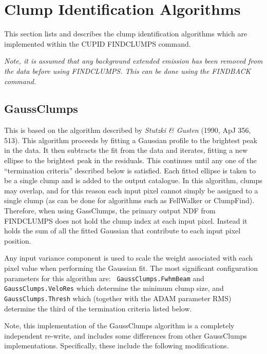 \documentclass[twoside,11pt]{article}
\newcommand{\htmlref}[2]{#1}
\newcommand{\xlabel}[1]{}
\renewcommand{\_}{\texttt{\symbol{95}}}
\begin{document}
\section{Clump Identification Algorithms}
This section lists and describes the clump identification algorithms
which are implemented within the CUPID \htmlref{FINDCLUMPS}{FINDCLUMPS}
command.

\begin{center}
\emph{Note, it is assumed that any background extended emission has
been removed from the data before using FINDCLUMPS. This can be done
using the \htmlref{FINDBACK}{FINDBACK} command.}
\end{center}

\subsection{\xlabel{gaussclumps}GaussClumps}

This is based on the algorithm described by \emph{Stutzki \& Gusten}
(1990, ApJ 356, 513). This algorithm proceeds by fitting a Gaussian
profile to the brightest peak in the data. It then subtracts the fit from
the data and iterates, fitting a new ellipse to the brightest peak in the
residuals. This continues until any one of the ``termination criteria''
described below is satisfied. Each fitted ellipse is taken to be a single
clump and is added to the output catalogue. In this algorithm, clumps may
overlap, and for this reason each input pixel cannot simply be assigned
to a single clump (as can be done for algorithms such as FellWalker or
ClumpFind). Therefore, when using GassClumps, the primary output NDF from
FINDCLUMPS does not hold the clump index at each input pixel. Instead it
holds the sum of all the fitted Gaussian that contribute to each input
pixel position.

Any input variance component is used to scale the weight associated with
each pixel value when performing the Gaussian fit. The most significant
configuration parameters for this algorithm are: {\tt
GaussClumps.FwhmBeam} and {\tt GaussClumps.VeloRes} which determine the
minimum clump size, and {\tt GaussClumps.Thresh} which (together with the
ADAM parameter RMS) determine the third of the termination
criteria listed below.

Note, this implementation of the GaussClumps algorithm is a completely
independent re-write, and includes some differences from other
GaussClumps implementations. Specifically, these include the following
modifications.
\end{document}
